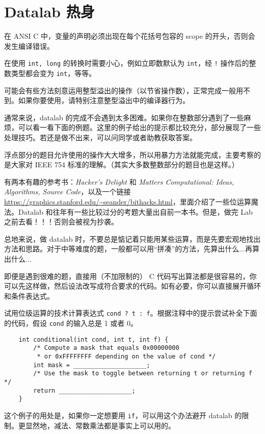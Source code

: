 \chapter{Datalab 热身}
    \begin{summary}
        \begin{compactitem}
            \item 在 ANSI C 中，变量的声明必须出现在每个花括号包容的 scope 的开头，否则会发生编译错误。
            \item 在使用 \texttt{int, long} 的转换时需要小心，例如立即数默认为 \texttt{int}，经 \texttt{!} 操作后的整数类型都会变为 \texttt{int}，等等。
            \item 可能会有些方法刻意运用整型溢出的操作（以节省操作数），正常完成一般用不到。如果你要使用，请特别注意整型溢出中的编译器行为。
            \item 通常来说，datalab 的完成不会遇到太多困难。如果你在整数部分遇到了一些麻烦，可以看一看下面的例题。这里的例子给出的提示都比较充分，部分展现了一些处理技巧。若还是做不出来，可以问同学或者助教获取答案。
            \item 浮点部分的题目允许使用的操作大大增多，所以用暴力方法就能完成，主要考察的是大家对 IEEE 754 标准的理解。（其实大多数整数部分的题目也是这样。）
            \item 有两本有趣的参考书：\textit{Hacker's Delight} 和 \textit{Matters Computational: Ideas, Algorithms, Source Code}，以及一个链接 \url{https://graphics.stanford.edu/~seander/bithacks.html}，里面介绍了一些位运算魔法。Datalab 和往年有一些比较过分的考题大量出自前一本书。但是，做完 Lab 之前去看！！！否则会被视为抄袭。 
        \end{compactitem}
    \end{summary}

    总地来说，做 datalab 时，不要总是惦记着只能用某些运算，而是先要宏观地找出方法和思路。对于中等难度的题，一般都可以用“拼凑”的方法，先算出什么...再算出什么...
    
    即便是遇到很难的题，直接用（不加限制的） C 代码写出算法都是很容易的，你可以先这样做，然后设法改写成符合要求的代码。如有必要，你可以直接展开循环和条件表达式。

    \begin{example}[表达式]
        试用位级运算的技术计算表达式 \texttt{cond ? t : f}。根据注释中的提示尝试补全下面的代码，假设 \texttt{cond} 的输入总是 1 或者 0。
        \begin{verbatim}
    int conditional(int cond, int t, int f) {
        /* Compute a mask that equals 0x00000000
         * or 0xFFFFFFFF depending on the value of cond */
        int mask = ____________________;
        /* Use the mask to toggle between returning t or returning f */
        return ____________________;
    }
        \end{verbatim}
        这个例子的用处是，如果你一定想要用 \texttt{if}，可以用这个办法避开 datalab 的限制。更显然地，减法、常数乘法都是事实上可以用的。
    \end{example}


